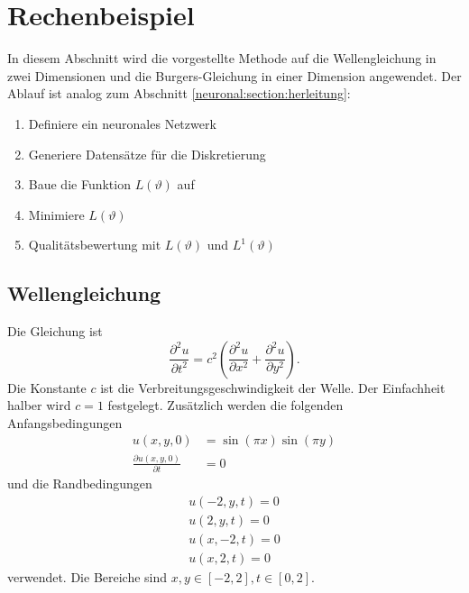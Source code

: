 %
%
%
%

\section{Rechenbeispiel\label{neuronal:section:rechenbeispiel}}

In diesem Abschnitt wird die vorgestellte Methode auf die Wellengleichung in zwei Dimensionen und die Burgers-Gleichung in einer Dimension angewendet.
Der Ablauf ist analog zum Abschnitt \ref{neuronal:section:herleitung}:
\begin{enumerate}
    \item Definiere ein neuronales Netzwerk
    \item Generiere Datensätze für die Diskretierung
    \item Baue die Funktion $L(\vartheta)$ auf
    \item Minimiere $L(\vartheta)$
    \item Qualitätsbewertung mit $L(\vartheta)$ und $L^1(\vartheta)$
\end{enumerate}

\subsection{Wellengleichung}\label{neuronal:subsection:wellengleichung}
Die Gleichung ist
\begin{equation}
    \frac{\partial^2 u}{\partial t^2} = c^2 \left( \frac{\partial^2 u}{\partial x^2} + \frac{\partial^2 u}{\partial y^2} \right).
    \label{neuronal:wellengleichung}
\end{equation}
Die Konstante \( c \) ist die Verbreitungsgeschwindigkeit der Welle. Der Einfachheit halber wird $c = 1$ festgelegt.
Zusätzlich werden die folgenden Anfangsbedingungen
\begin{equation}
    \begin{aligned}
        u(x, y, 0) &= \sin(\pi x) \sin(\pi y)\\
        \frac{\partial u(x, y, 0)}{\partial t} &= 0
    \end{aligned}
    \label{neuronal:wellen_anfangs}
\end{equation}
und die Randbedingungen
\begin{equation}
    \begin{aligned}
        u(-2, y, t) = 0\\
        u(2, y, t) = 0\\
        u(x, -2, t) = 0\\
        u(x, 2, t) = 0
    \end{aligned}
    \label{neuronal:wellen_rand}
\end{equation}
verwendet.
Die Bereiche sind \( x, y \in [-2,2], t \in [0,2] \).

